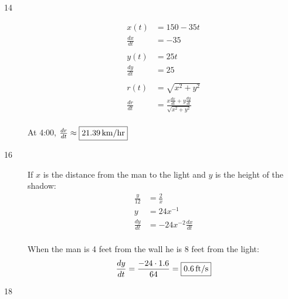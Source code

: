 \documentclass[letterpaper, landscape]{exam}
\begin{document}
\begin{description}
    \item[14]
      \begin{align*}
        x(t)          & = 150 - 35 t \\
        \frac{dx}{dt} & = -35 \\
        \\
        y(t)          & = 25 t \\
        \frac{dy}{dt} & = 25 \\
        \\
        r(t)          & = \sqrt{x^2 + y^2} \\
        \frac{dr}{dt} & = \frac{x \frac{dx}{dt} + y \frac{dy}{dt}}{\sqrt{x^2 + y^2}} \\
      \end{align*}

      At 4:00, $\frac{dr}{dt} \approx \boxed{ \unit[21.39]{km/hr} }$

    \item[16]
      If $x$ is the distance from the man to the light and $y$ is the height of the shadow:
      \begin{align*}
        \frac{y}{12}  & = \frac{2}{x} \\
        y             & = 24 x^{-1} \\
        \frac{dy}{dt} & = -24 x^{-2} \frac{dx}{dt} \\
      \end{align*}

      When the man is 4 feet from the wall he is 8 feet from the light:
      \[
        \frac{dy}{dt} = \frac{-24 \cdot 1.6}{64} = \boxed{ \unit[0.6]{ft/s} }
      \]



    \item[18]
      \begin{enumerate}[(a)]


\end{enumerate}
\end{description}
\end{document}

